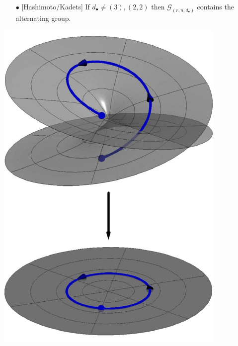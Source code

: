 \documentclass{beamer}
\theoremstyle{definition}
\begin{document}
\begin{frame}
\begin{minipage}{.71\textwidth}
\begin{enumerate}
\item[$\bullet$] [Hashimoto/Kadets] If $d_\bullet\ne(3),(2,2)$ then $\mathcal{G}_{(r,n,d_\bullet)}$ contains the alternating group.
\end{enumerate}
\end{minipage}
%
\begin{minipage}{.25\textwidth}
\begin{center}
\includegraphics[scale=.48]{figures/monodromy.pdf}
\end{center}
\end{minipage}




\end{frame}


\end{document}
